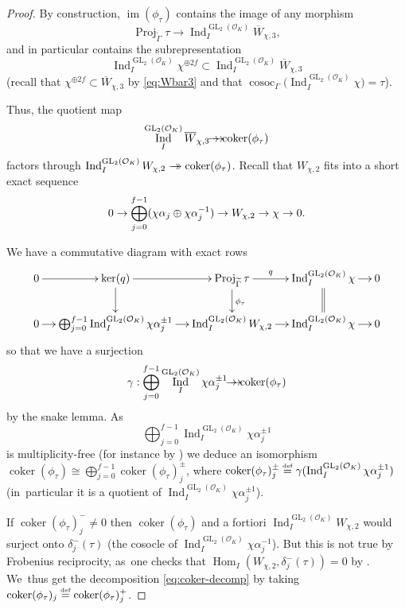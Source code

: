 \documentclass[JEP,XML,SOM,Unicode,NoFloatCountersInSection, NoEqCountersInSection,published]{cedram}
\newcommand{\onto}{\mathchoice{\to\hspace*{-5mm}\to}{\mathrel{\hbox{$\to\hspace*{-2.85mm}\to$}}}{\to\hspace*{-3mm}\to}{\to\hspace*{-3mm}\to}}
\let\wt\widetilde
\newcommand{\defeq}{\stackrel{\textrm{\tiny{\upshape{def}}}}{=}}
\newcommand{\cO}{\mathcal{O}}
\DeclareMathOperator{\coker}{coker}
\DeclareMathOperator{\cosoc}{cosoc}
\DeclareMathOperator{\GL}{GL}
\DeclareMathOperator{\Hom}{Hom}
\DeclareMathOperator{\im}{im}
\DeclareMathOperator{\Ind}{Ind}
\DeclareMathOperator{\Proj}{Proj}
\theoremstyle{plain}
\theoremstyle{definition}
\begin{document}
\begin{proof}
By construction, $\im(\phi_\tau)$ contains the image of any morphism
\[
\Proj_{\wt{\Gamma}}\tau\to \Ind_I^{\GL_2(\cO_K)}\overline{W}_{\chi,3},
\]
and in particular contains the subrepresentation
\[
\Ind_I^{\GL_2(\cO_K)}\chi^{\oplus 2f}\subset \Ind_I^{\GL_2(\cO_K)}\overline{W}_{\chi,3}
\]
(recall that $\chi^{\oplus 2f}\subset \overline{W}_{\chi,3}$ by \eqref{eq:Wbar3} and that $\cosoc_\Gamma\bigl(\Ind_I^{\GL_2(\cO_K)}\chi\bigr)=\tau$).

Thus, the quotient map
\[
\Ind_I^{\GL_2(\cO_K)}\overline{W}_{\chi,3}\onto \coker(\phi_\tau)
\]
factors through $\Ind_I^{\GL_2(\cO_K)}W_{\chi,2}\onto \coker(\phi_{\tau})$. Recall that $W_{\chi,2}$ fits into a short exact sequence
\[
0\to \bigoplus_{j=0}^{f-1}(\chi\alpha_j\oplus \chi\alpha_j^{-1})\to W_{\chi,2}\rightarrow\chi\rightarrow0.
\]

We have a commutative diagram with exact rows
\begin{equation*}
\xymatrix@C=.4cm@R=.7cm{0 \ar[r] & \ker(q) \ar[r]\ar[d] & \Proj_{\wt{\Gamma}}\tau \ar^-q[r]\ar^{\phi_\tau}[d] & \Ind_I^{\GL_2(\cO_K)}\chi \ar[r]\ar@{=}[d] & 0 \\
0 \ar[r] & \bigoplus_{j=0}^{f-1}\Ind_I^{\GL_2(\cO_K)}\chi\alpha_j^{\pm 1}\ar[r] & \Ind_I^{\GL_2(\cO_K)}W_{\chi,2}\ar[r] & \Ind_I^{\GL_2(\cO_K)}\chi \ar[r] & 0
}
\end{equation*}
so that we have a surjection
\[
\gamma:\bigoplus_{j=0}^{f-1}\Ind_I^{\GL_2(\cO_K)}\chi\alpha_j^{\pm 1} \onto \coker(\phi_\tau)
\]
by the snake lemma. As
\[
\bigoplus_{j=0}^{f-1}\Ind_I^{\GL_2(\cO_K)}\chi\alpha_j^{\pm 1}
\]
is multiplicity-free (for instance by \cite[Lem.\,4.3.3]{BHHMS4}) we deduce an isomorphism $\coker(\phi_\tau)\cong \bigoplus_{j=0}^{f-1}\coker(\phi_\tau)^{\pm}_j$, where $\coker(\phi_\tau)^{\pm}_j \defeq \gamma(\Ind_I^{\GL_2(\cO_K)}\chi\alpha^{\pm 1}_j)$ (in~particular it is a quotient of $\Ind_I^{\GL_2(\cO_K)}\chi\alpha^{\pm 1}_j$).

If $\coker(\phi_\tau)^{-}_j\neq 0$ then $\coker(\phi_\tau)$ and a fortiori $\Ind_I^{\GL_2(\cO_K)}W_{\chi,2}$ would surject onto $\delta_j^-(\tau)$ (the cosocle of $\Ind_I^{\GL_2(\cO_K)}\chi\alpha_j^{-1}$).
But this is not true by Frobenius reciprocity, as~one checks that $\Hom_{I}(W_{\chi,2}, \delta_j^-(\tau))=0$ by \cite[Lem.\,3.42(ii)]{BHHMS2}. We~thus get the decomposition \eqref{eq:coker-decomp} by taking $\coker(\phi_\tau)_j\defeq \coker(\phi_\tau)^+_j$.


\end{proof}
\end{document}
